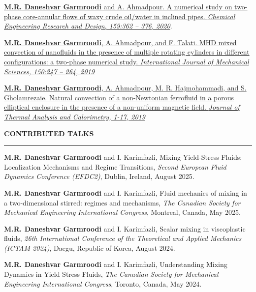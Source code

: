 \documentclass[10pt]{article}
\begin{document}
		\noindent  \href{https://doi.org/10.1016/j.cherd.2020.04.017}{\textbf{M.R. Daneshvar Garmroodi} and A. Ahmadpour. A numerical study on two-phase core-annular flows of waxy crude oil/water in inclined pipes.\textit{ Chemical Engineering Research and Design, 159:362
				– 376, 2020}}.
		
		\noindent \href{https://doi.org/10.1016/j.ijmecsci.2018.10.037}{\textbf{M.R. Daneshvar Garmroodi}, A. Ahmadpour, and F. Talati. MHD mixed convection
			of nanofluids in the presence of multiple rotating cylinders in different configurations:
			a two-phase numerical study.\textit{ International Journal of Mechanical Sciences, 150:247
				– 264, 2019}}
		
		\noindent  \href{https://link.springer.com/article/10.1007/s10973-019-09045-3}{\textbf{M.R. Daneshvar Garmroodi}, A. Ahmadpour, M. R. Hajmohammadi, and S. Gholamrezaie. Natural convection of a non-Newtonian ferrofluid in a porous elliptical enclosure in the presence of a non-uniform magnetic field.\textit{ Journal of Thermal Analysis and Calorimetry, 1-17, 2019}}
		
		\vspace{3mm}
		
		\noindent \textbf{\color{violet}CONTRIBUTED TALKS}
		
		\vspace{-2mm}
		
		\noindent\rule[0.5ex]{\linewidth}{1pt}
		
		
		\noindent \textbf{M.R. Daneshvar Garmroodi} and I. Karimfazli, Mixing Yield-Stress Fluids: Localization Mechanisms and Regime Transitions, \textit{Second European Fluid Dynamics Conference  (EFDC2)}, Dublin, Ireland, August 2025.
		
		\noindent \textbf{M.R. Daneshvar Garmroodi} and I. Karimfazli, Fluid mechanics of mixing in a two-dimensional stirred: regimes and mechanisms, \textit{The Canadian Society for Mechanical Engineering International Congress}, Montreal, Canada, May 2025.
		
		\noindent \textbf{M.R. Daneshvar Garmroodi} and I. Karimfazli, Scalar mixing in viscoplastic fluids, \textit{26th International Conference of the Theoretical and Applied Mechanics (ICTAM 2024)}, Daegu, Republic of Korea, August 2024.
		
		\noindent  \textbf{M.R. Daneshvar Garmroodi} and I. Karimfazli, Understanding Mixing Dynamics in Yield Stress
		Fluids, \textit{The Canadian Society for Mechanical Engineering International Congress}, Toronto, Canada, May 2024.
		
\end{document}
